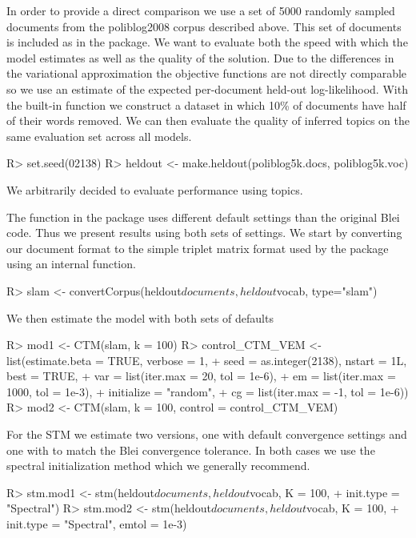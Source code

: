 \documentclass[article,shortnames]{jss}
\begin{document}
In order to provide a direct comparison we use a set of 5000 randomly sampled documents from the poliblog2008 corpus described above.  This set of documents is included as  in the  package.  We want to evaluate both the speed with which the model estimates as well as the quality of the solution.  Due to the differences in the variational approximation the objective functions are not directly comparable so we use an estimate of the expected per-document held-out log-likelihood.  With the built-in function  we construct a dataset in which 10\% of documents have half of their words removed.  We can then evaluate the quality of inferred topics on the same evaluation set across all models.
\begin{Schunk}
\begin{Sinput}
R> set.seed(02138)
R> heldout <- make.heldout(poliblog5k.docs, poliblog5k.voc)
\end{Sinput}
\end{Schunk}
We arbitrarily decided to evaluate performance using  topics.

The function  in the  package uses different default settings than the original Blei code.  Thus we present results using both sets of settings. We start by converting our document format to the simple triplet matrix format used by the  package using an internal  function.
\begin{Schunk}
\begin{Sinput}
R> slam <- convertCorpus(heldout$documents, heldout$vocab, type="slam")
\end{Sinput}
\end{Schunk}

We then estimate the model with both sets of defaults
\begin{Schunk}
\begin{Sinput}
R> mod1 <- CTM(slam, k = 100)
R> control_CTM_VEM <- list(estimate.beta = TRUE, verbose = 1,
+  seed = as.integer(2138), nstart = 1L, best = TRUE,
+  var = list(iter.max = 20, tol = 1e-6),
+  em = list(iter.max = 1000, tol = 1e-3),
+  initialize = "random",
+  cg = list(iter.max = -1, tol = 1e-6))
R> mod2 <- CTM(slam, k = 100, control = control_CTM_VEM)
\end{Sinput}
\end{Schunk}

For the STM we estimate two versions, one with default convergence settings and one with  to match the Blei convergence tolerance.  In both cases we use the spectral initialization method which we generally recommend.
\begin{Schunk}
\begin{Sinput}
R> stm.mod1 <- stm(heldout$documents, heldout$vocab, K = 100,
+  init.type = "Spectral")
R> stm.mod2 <- stm(heldout$documents, heldout$vocab, K = 100,
+  init.type = "Spectral", emtol = 1e-3)
\end{Sinput}
\end{Schunk}
\end{document}
